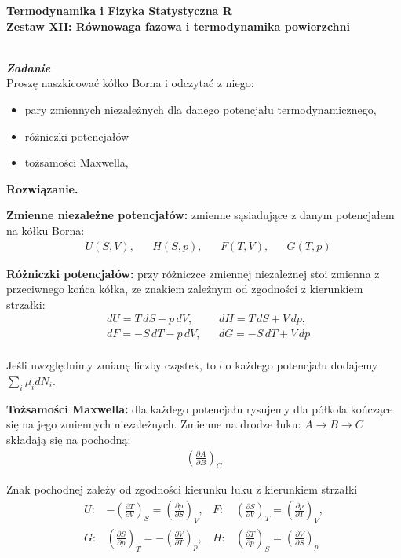 \documentclass[11pt,a4paper]{article}
\newcounter{zadanie}\newcommand{\zadanie}[1][]{\addtocounter{zadanie}{1} ~\\ {\bf \emph{Zadanie \arabic{zadanie} #1 }} \\}
\newenvironment{solution}{\vspace{1cm} \par\textbf{Rozwiązanie.} \vspace{1cm}}{}
\begin{document}
   

\begin{centering}
  {\bf {\Large
  Termodynamika i Fizyka Statystyczna R \\
  Zestaw XII: Równowaga fazowa i termodynamika powierzchni \\
  }} 
\end{centering}

\vspace{1cm}

\zadanie[]

Proszę naszkicować kółko Borna i odczytać z niego:
\begin{itemize}
  \item pary zmiennych niezależnych dla danego potencjału termodynamicznego,
  \item różniczki potencjałów
  \item tożsamości Maxwella,
\end{itemize}


\begin{solution}

\DrawBornCircle

{\bf Zmienne niezależne potencjałów:} zmienne sąsiadujące z danym potencjałem na kółku Borna:
\begin{align*}
&U(S,V), &&H(S,p), &&F(T,V), &&G(T,p)
\end{align*}

{\bf Różniczki potencjałów:} przy różniczce zmiennej niezależnej stoi zmienna z przeciwnego 
końca kółka, ze znakiem zależnym od zgodności z kierunkiem strzałki:
\begin{align*}
&dU = T\,dS - p\,dV, &&dH = T\,dS + V\,dp,\\
&dF = -S\,dT - p\,dV, &&dG = -S\,dT + V\,dp \\
\end{align*}

Jeśli uwzględnimy zmianę liczby cząstek, to do każdego potencjału dodajemy $\sum_i \mu_i dN_i$.

\vskip 0.5cm

{\bf Tożsamości Maxwella:} dla każdego potencjału rysujemy dla półkola kończące się
na jego zmiennych niezależnych. Zmienne na drodze łuku: $A \rightarrow B \rightarrow C$ składają się
na pochodną:
\begin{align*}
  \left(\frac{\partial A}{\partial B} \right)_C
\end{align*}

Znak pochodnej zależy od zgodności kierunku łuku z kierunkiem strzałki
\begin{align*}
U: & -\left(\frac{\partial T}{\partial V}\right)_S = \left(\frac{\partial p}{\partial S}\right)_V, &
F: & \left(\frac{\partial S}{\partial V}\right)_T = \left(\frac{\partial p}{\partial T}\right)_V, \\
G: & \left(\frac{\partial S}{\partial p}\right)_T = -\left(\frac{\partial V}{\partial T}\right)_p, &
H: & \left(\frac{\partial T}{\partial p}\right)_S = \left(\frac{\partial V}{\partial S}\right)_p
\end{align*}

\newpage
\end{solution}
\end{document}
